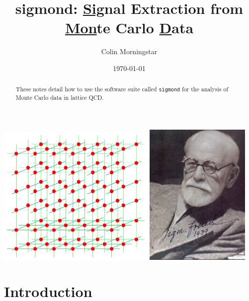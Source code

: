 \documentclass[12pt]{article}
\newcommand{\sigmond}{\texttt{sigmond} }
\begin{document}
\title{\bf sigmond: \underline{Sig}nal Extraction from\\
  \underline{Mon}te Carlo
  \underline{D}ata}
\author{Colin Morningstar}
\date{\today}
\maketitle
\begin{abstract}
  These notes detail how to use the software suite called \sigmond for
  the analysis of Monte Carlo data in lattice QCD.
\end{abstract}
\vspace*{20mm}
\begin{center}
\includegraphics[width=3.0in]{lattice.png}\hspace*{8mm}
\includegraphics[width=2.0in]{freud.jpg}
\end{center}

\newpage

\tableofcontents

\newpage

\section{Introduction}
\end{document}
